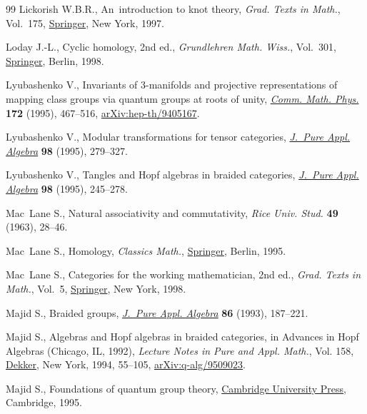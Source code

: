 \documentclass[pdftex]{sigma}
\numberwithin{equation}{section}
\begin{document}
\begin{thebibliography}{99}
Lickorish W.B.R., An~introduction to knot theory, \textit{Grad. Texts in
 Math.}, Vol.~175, \href{https://doi.org/10.1007/978-1-4612-0691-0}{Springer},
 New York, 1997.

Loday J.-L., Cyclic homology, 2nd ed., \textit{Grundlehren Math. Wiss.}, Vol.~301,
 \href{https://doi.org/10.1007/978-3-662-11389-9}{Springer}, Berlin, 1998.

Lyubashenko V., Invariants of {$3$}-manifolds and projective representations of
 mapping class groups via quantum groups at roots of unity,
 \href{https://doi.org/10.1007/BF02101805}{\textit{Comm. Math. Phys.}}
 \textbf{172} (1995), 467--516,
 \href{http://arxiv.org/abs/hep-th/9405167}{arXiv:hep-th/9405167}.

Lyubashenko V., Modular transformations for tensor categories,
 \href{https://doi.org/10.1016/0022-4049(94)00045-K}{\textit{J.~Pure Appl.
 Algebra}} \textbf{98} (1995), 279--327.

Lyubashenko V., Tangles and {H}opf algebras in braided categories,
 \href{https://doi.org/10.1016/0022-4049(95)00044-W}{\textit{J.~Pure Appl.
 Algebra}} \textbf{98} (1995), 245--278.

Mac~Lane S., Natural associativity and commutativity, \textit{Rice Univ. Stud.}
 \textbf{49} (1963), 28--46.

Mac~Lane S., Homology, \textit{Classics Math.},
 \href{https://doi.org/10.1007/978-3-642-62029-4}{Springer}, Berlin, 1995.

Mac~Lane S., Categories for the working mathematician, 2nd ed., \textit{Grad. Texts in
 Math.}, Vol.~5,
 \href{https://doi.org/10.1007/978-1-4757-4721-8}{Springer}, New York, 1998.

Majid S., Braided groups,
 \href{https://doi.org/10.1016/0022-4049(93)90103-Z}{\textit{J.~Pure Appl.
 Algebra}} \textbf{86} (1993), 187--221.

Majid S., Algebras and {H}opf algebras in braided categories, in Advances in
 {H}opf Algebras ({C}hicago, {IL}, 1992), \textit{Lecture Notes in Pure and
 Appl. Math.}, Vol. 158,
 \href{https://doi.org/10.1201/9781003419792-4}{Dekker}, New York, 1994,
 55--105, \href{http://arxiv.org/abs/q-alg/9509023}{arXiv:q-alg/9509023}.

Majid S., Foundations of quantum group theory,
 \href{https://doi.org/10.1017/CBO9780511613104}{Cambridge University Press},
 Cambridge, 1995.


\end{thebibliography}
\end{document}
